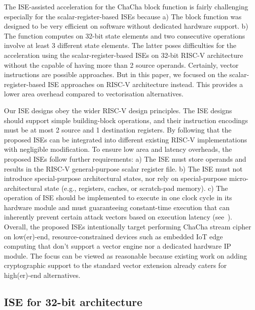 
The ISE-assisted acceleration for the ChaCha block function is fairly challenging especially for the scalar-register-based ISEs because 
a) The block function was designed to be very efficient on software without dedicated hardware support. 
b) The function computes on 32-bit state elements and two consecutive operations involve at least 3 different state elements. 
The latter poses difficulties for the acceleration using the scalar-register-based ISEs on 32-bit RISC-V architecture without the capable of having more than 2 source operands.
Certainly, vector instructions are possible approaches. 
But in this paper, we focused on the scalar-register-based ISE approaches on RISC-V architecture instead. 
This provides a lower area overhead compared to vectorisation alternatives. 

Our ISE designs obey the wider RISC-V design principles. 
The ISE designs should support simple building-block operations, and their instruction encodings must be at most 2 source and 1 destination registers. 
By following that the proposed ISEs can be integrated into different existing RISC-V implementations with negligible modification.
To ensure low area and latency overheads, the proposed ISEs follow further requirements: 
a) The ISE must store operands and results in the RISC-V general-purpose scalar register file. 
b) The ISE must not introduce special-purpose architectural states, nor rely on special-purpose micro-architectural state (e.g., registers, caches, or scratch-pad memory).
c) The operation of ISE should be implemented to execute in one clock cycle in its hardware module and must guaranteeing constant-time execution that can  inherently prevent certain attack vectors based on execution latency (see~\cite[Section 4]{GYC:18}).
Overall, the proposed ISEs intentionally target performing ChaCha stream cipher on low(er)-end, resource-constrained devices such as embedded IoT edge computing that don't support a vector engine nor a dedicated hardware IP module. The focus can be viewed as reasonable because existing work on adding cryptographic support to the standard vector extension \cite{riscv:ext:vector:draft} already caters for high(er)-end alternatives. 

\subsection{ISE for 32-bit architecture}

